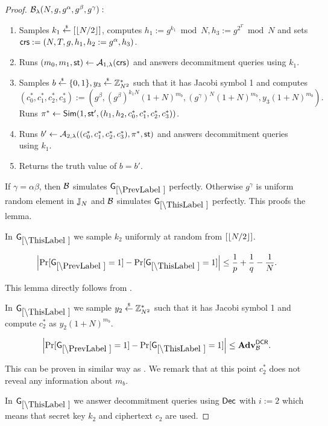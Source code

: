 \begin{proof}
$\mathcal{B}_{\lambda}(N,g,g^\alpha, g^\beta, g^\gamma):$
\vspace{-2mm}
\begin{enumerate}
\item Samples $k_1 \stackrel{{\scriptscriptstyle\$}}{\leftarrow} [\left\lfloor N/2 \right\rfloor]$, computes $h_1 := g^{k_1} \bmod N,  h_3 := g^{2^{T}} \bmod N$ and sets $\mathsf{crs}:=(N, T, g, h_1, h_2:=g^\alpha, h_3)$.
\item Runs $(m_0, m_1, \mathsf{st}) \leftarrow \mathcal{A}_{1, \lambda}(\mathsf{crs})$ and answers decommitment queries using $k_1$.
\item Samples $b \stackrel{{\scriptscriptstyle\$}}{\leftarrow} \{0,1\}, y_3 \stackrel{{\scriptscriptstyle\$}}{\leftarrow} \mathbb{Z}_{N^2}^*$ such that it has Jacobi symbol 1 and computes $(c_0^*, c_1^*, c_2^*, c_3^*):=(g^\beta, (g^\beta)^{k_1 N}(1+N)^{m_b}, (g^{\gamma})^N(1+N)^{m_b}, y_3(1+N)^{m_b}).$ Runs $\pi^* \leftarrow \mathsf{Sim}(1, \mathsf{st}', (h_1, h_2, c_0^*, c_1^*, c_2^*, c_3^*))$.
\item Runs $b' \leftarrow \mathcal{A}_{2, \lambda}((c_0^*, c_1^*, c_2^*,c_3^*), \pi^*, \mathsf{st})$ and answers decommitment queries using $k_1$.
\item Returns the truth value of $b=b'$.
\end{enumerate}
If $\gamma = \alpha\beta$, then $\mathcal{B}$ simulates $\games_\prevgame$ perfectly. Otherwise $g^\gamma$ is uniform random element in $\mathbb{J}_N$ and $\mathcal{B}$ simulates $\games_\thisgame$ perfectly. This proofs the lemma.

In $\games_\thisgame$ we sample $k_2$ uniformly at random from $[\left\lfloor N/2 \right\rfloor]$. 

\begin{lemma}
\[
\left|\Pr[\games_\prevgame = 1] - \Pr[\games_\thisgame = 1]\right| \leq \frac{1}{p}+\frac{1}{q}-\frac{1}{N}.
\]
\end{lemma}

This lemma directly follows from .

In $\games_\thisgame$ we sample $y_2 \stackrel{{\scriptscriptstyle\$}}{\leftarrow} \mathbb{Z}_{N^2}^*$ such that it has Jacobi symbol 1 and compute $c_2^*$ as $y_2(1+N)^{m_b}$. 

\begin{lemma}
\[
\left|\Pr[\games_\prevgame = 1] - \Pr[\games_\thisgame = 1]\right| \leq \advtg_\advB^\dcr.
\]
\end{lemma}
This can be proven in similar way as . We remark that at this point $c_2^*$ does not reveal any information about $m_b$.




In $\games_\thisgame$ we answer decommitment queries using $\mathsf{Dec}$ with $i:=2$ which means that secret key $k_2$ and ciphertext $c_2$ are used. 


\end{proof}
